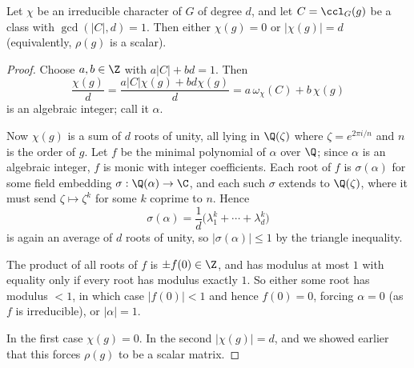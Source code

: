 \begin{lemma}
	Let $\chi$ be an irreducible character of $G$ of degree $d$, and let $C = \ccl_G(g)$ be a class with $\gcd(|C|, d) = 1$. Then either $\chi(g) = 0$ or $|\chi(g)| = d$ (equivalently, $\rho(g)$ is a scalar).
\end{lemma}
\begin{proof}
	Choose $a,b\in\Z$ with $a|C| + bd = 1$. Then
	$$\frac{\chi(g)}{d} = \frac{a|C|\chi(g) + bd\chi(g)}{d} = a\,\omega_\chi(C) + b\,\chi(g)$$
	is an algebraic integer; call it $\alpha$.

	Now $\chi(g)$ is a sum of $d$ roots of unity, all lying in $\Q(\zeta)$ where $\zeta = e^{2\pi i/n}$ and $n$ is the order of $g$. Let $f$ be the minimal polynomial of $\alpha$ over $\Q$; since $\alpha$ is an algebraic integer, $f$ is monic with integer coefficients. Each root of $f$ is $\sigma(\alpha)$ for some field embedding $\sigma : \Q(\alpha)\to\C$, and each such $\sigma$ extends to $\Q(\zeta)$, where it must send $\zeta\mapsto\zeta^k$ for some $k$ coprime to $n$. Hence
	$$\sigma(\alpha) = \frac1d\big(\lambda_1^k+\cdots+\lambda_d^k\big)$$
	is again an average of $d$ roots of unity, so $|\sigma(\alpha)|\leq 1$ by the triangle inequality.

	The product of all roots of $f$ is $\pm f(0)\in\Z$, and has modulus at most $1$ with equality only if every root has modulus exactly $1$. So either some root has modulus $<1$, in which case $|f(0)| < 1$ and hence $f(0) = 0$, forcing $\alpha = 0$ (as $f$ is irreducible), or $|\alpha| = 1$.

	In the first case $\chi(g) = 0$. In the second $|\chi(g)| = d$, and we showed earlier that this forces $\rho(g)$ to be a scalar matrix.
\end{proof}

